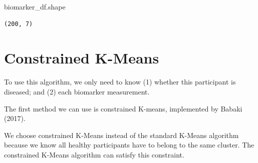 \documentclass[
  letterpaper,
  DIV=11,
  numbers=noendperiod]{scrreprt}
\newenvironment{Shaded}{\begin{snugshade}}{\end{snugshade}}
\newcommand{\NormalTok}[1]{\textcolor[rgb]{0.00,0.23,0.31}{#1}}
\begin{document}
\begin{Shaded}
\begin{Highlighting}[]
\NormalTok{biomarker\_df.shape}
\end{Highlighting}
\end{Shaded}

\begin{verbatim}
(200, 7)
\end{verbatim}

\section{Constrained K-Means}\label{sec-cop-kmeans}

\begin{tcolorbox}[enhanced jigsaw, bottomrule=.15mm, colback=white, bottomtitle=1mm, titlerule=0mm, arc=.35mm, breakable, rightrule=.15mm, opacityback=0, leftrule=.75mm, opacitybacktitle=0.6, colframe=quarto-callout-tip-color-frame, coltitle=black, toptitle=1mm, colbacktitle=quarto-callout-tip-color!10!white, title=\textcolor{quarto-callout-tip-color}{\faLightbulb}\hspace{0.5em}{Tip}, left=2mm, toprule=.15mm]

To use this algorithm, we only need to know (1) whether this participant
is diseased; and (2) each biomarker measurement.

\end{tcolorbox}

The first method we can use is constrained K-means, implemented by
Babaki (2017).

We choose constrained K-Means instead of the standard K-Means algorithm
because we know all healthy participants have to belong to the same
cluster. The constrained K-Means algorithm can satisfy this constraint.
\end{document}
